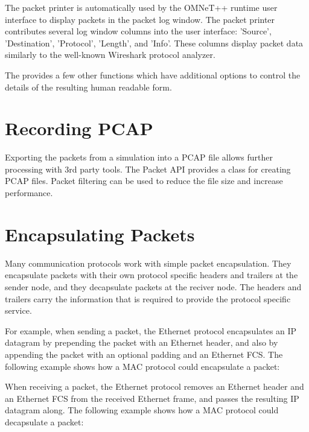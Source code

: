 The packet printer is automatically used by the OMNeT++ runtime user interface
to display packets in the packet log window. The packet printer contributes
several log window columns into the user interface: 'Source', 'Destination',
'Protocol', 'Length', and 'Info'. These columns display packet data similarly to
the well-known Wireshark protocol analyzer.


The  provides a few other functions which have
additional options to control the details of the resulting human readable form.

\section{Recording PCAP}
\label{sec:packets:recording-pcap}

Exporting the packets from a simulation into a PCAP file allows further
processing with 3rd party tools. The Packet API provides a 
class for creating PCAP files. Packet filtering can be used to reduce the file
size and increase performance.


\section{Encapsulating Packets}
\label{sec:packets:encapsulating-packets}

Many communication protocols work with simple packet encapsulation. They
encapsulate packets with their own protocol specific headers and trailers at the
sender node, and they decapsulate packets at the reciver node. The headers and
trailers carry the information that is required to provide the protocol specific
service.

For example, when sending a packet, the Ethernet protocol encapsulates an IP
datagram by prepending the packet with an Ethernet header, and also by appending
the packet with an optional padding and an Ethernet FCS. The following example
shows how a MAC protocol could encapsulate a packet:


When receiving a packet, the Ethernet protocol removes an Ethernet header and an
Ethernet FCS from the received Ethernet frame, and passes the resulting IP
datagram along. The following example shows how a MAC protocol could decapsulate
a packet:

